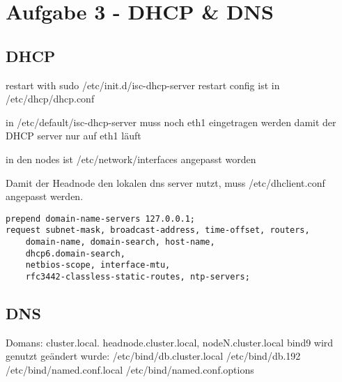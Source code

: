 \chapter{Aufgabe 3 - DHCP \& DNS}
\section{DHCP}
restart with
sudo /etc/init.d/isc-dhcp-server restart
config ist in /etc/dhcp/dhcp.conf

in /etc/default/isc-dhcp-server muss noch eth1 eingetragen werden damit der DHCP server nur auf eth1 läuft

in den nodes ist /etc/network/interfaces angepasst worden

Damit der Headnode den lokalen dns server nutzt, muss /etc/dhclient.conf angepasst werden.

\begin{lstlisting}[style=Bash]
prepend domain-name-servers 127.0.0.1;
request subnet-mask, broadcast-address, time-offset, routers,
	domain-name, domain-search, host-name,
	dhcp6.domain-search,
	netbios-scope, interface-mtu,
	rfc3442-classless-static-routes, ntp-servers;
\end{lstlisting}

\section{DNS}
Domans: cluster.local. headnode.cluster.local, nodeN.cluster.local
bind9 wird genutzt
geändert wurde:
/etc/bind/db.cluster.local
/etc/bind/db.192
/etc/bind/named.conf.local
/etc/bind/named.conf.options
